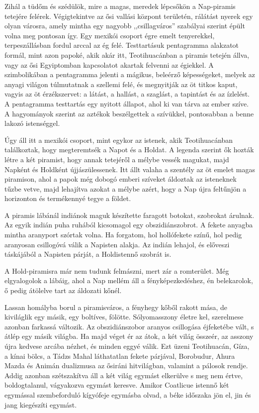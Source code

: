 
Zihál a tüdőm és szédülök, mire a magas, meredek lépcsőkön a
Nap-piramis tetejére felérek. Végigtekintve az ősi vallási központ
területén, rálátást nyerek egy olyan városra, amely mintha egy nagyobb
,,csillagváros'' szabályai szerint épült volna meg pontosan így.
Egy mexikói csoport égre emelt tenyerekkel, terpeszállásban fordul
arccal az ég felé. Testtartásuk pentagramma alakzatot formál, mint
azon papoké, akik akár itt, Teotihuacánban a piramis tetején állva,
vagy az ősi Egyiptomban kapcsolatot akartak felvenni az égiekkel.
A szimbolikában a pentagramma jelenti a mágikus, beleérző képességeket,
melyek az anyagi világon túlmutatnak a szellemi felé,
és megnyitják az öt titkos kaput, vagyis az öt érzékszervet: a látást,
a hallást, a szaglást, a tapintást és az ízlelést. A pentagramma
testtartás egy nyitott állapot, ahol ki van tárva az ember szíve.
A hagyományok szerint az aztékok beszélgettek a szívükkel, pontosabban a
benne lakozó istenséggel.

Úgy áll itt a mexikói csoport, mint egykor az istenek, akik Teotihuacánban
találkoztak, hogy megteremtsék a Napot és a Holdat.
A legenda szerint ők hozták létre a két piramist, hogy annak tetejéről
a mélybe vessék magukat, majd Napként és Holdként újjászülessenek.
Itt állt valaha a szentély az öt emelet magas piramison, ahol a papok
még dobogó emberi szíveket áldoztak az isteneknek tűzbe vetve, majd
lehajítva azokat a mélybe azért, hogy a Nap újra feltűnjön a horizonton
és termékennyé tegye a földet.

A piramis lábánál indiánok maguk készítette faragott botokat,
szobrokat árulnak. Az egyik indián puha ruhából kicsomagol egy
obszidiánszobrot. A fekete anyagba mintha aranyport szórtak volna. Ha
forgatom, hol hollófekete színű, hol pedig aranyosan csillogóvá válik a
Napisten alakja. Az indián lehajol, és előveszi táskájából a Napisten
párját, a Holdistennő szobrát is.

A Hold-piramisra már nem tudunk felmászni, mert zár a romterület.
Még elgyalogolok a lábáig, ahol a Nap mellém áll a fényképezkedéshez,
én belekarolok, ő pedig átölelve tart az áldozati kőnél.

Lassan homályba borul a piramisváros, a fényhegy kőből rakott
mása, de kiviláglik egy másik, egy boltíves, fölötte. Sólyomasszony
életre kel, szerelmese azonban farkassá változik. Az obszidiánszobor
aranyos csillogása éjfeketébe vált, s átlép egy másik világba. Ha majd
véget ér az átok, a két világ összeér, az asszony újra kedvese arcába
nézhet, és minden eggyé válik. Ezt üzeni Teotihuacán, Gíza, a kínai bölcs,
a Tádzs Mahal láthatatlan fekete párjával, Borobudur, Ahura Mazda
és Animán dualizmusa az ősiráni hitvilágban, valamint a pálosok
rendje. Addig azonban szétszakítva áll a két világ egymást elkerülve s
meg nem értve, boldogtalanul, vágyakozva egymást keresve. Amikor
Coatlicue istennő két egymással szembeforduló kígyófeje egymásba
olvad, a béke időszaka jön el, jin és jang kiegészíti egymást.

